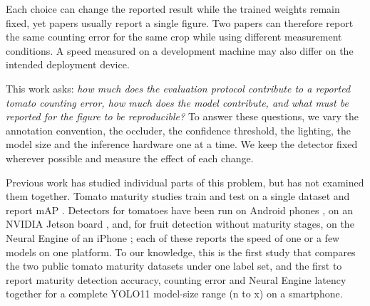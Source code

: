 Each choice can change the reported result while the trained weights remain
fixed, yet papers usually report a single figure. Two papers can therefore
report the same counting error for the same crop while using different
measurement conditions. A speed measured on a development machine may also
differ on the intended deployment device.

This work asks: \emph{how much does the evaluation protocol contribute to a
reported tomato counting error, how much does the model contribute, and what
must be reported for the figure to be reproducible?} To answer these questions,
we vary the annotation convention, the occluder, the confidence threshold, the
lighting, the model size and the inference hardware one at a time. We keep the
detector fixed wherever possible and measure the effect of each change.

Previous work has studied individual parts of this problem, but has not
examined them together. Tomato maturity studies train and test on a single
dataset and report mAP
\cite{su2022seyolov3, li2023yolov5tomato, li2023mhsayolov8, camacho2023tomato}.
Detectors for tomatoes have been run on Android phones
\cite{zeng2023mobile, jia2025tseyolo}, on an NVIDIA Jetson board
\cite{liu2025gaeyolo}, and, for fruit detection without maturity stages, on the
Neural Engine of an iPhone \cite{kafi2025drone}; each of these reports the
speed of one or a few models on one platform. To our knowledge, this is the
first study that compares the two public tomato maturity datasets under one
label set, and the first to report maturity detection accuracy, counting error
and Neural Engine latency together for a complete YOLO11 model-size range (n
to x) on a smartphone.

